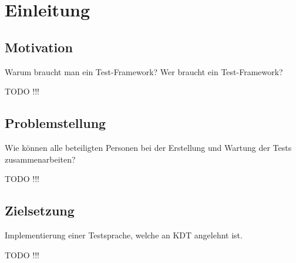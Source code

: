 ﻿\chapter{Einleitung}
\label{cha:Einleitung}

\section{Motivation}

Warum braucht man ein Test-Framework?
Wer braucht ein Test-Framework?

TODO !!!

\section{Problemstellung}

Wie können alle beteiligten Personen bei der Erstellung und Wartung der Tests zusammenarbeiten?

TODO !!!

\section{Zielsetzung}

Implementierung einer Testsprache, welche an KDT angelehnt ist.

TODO !!!
